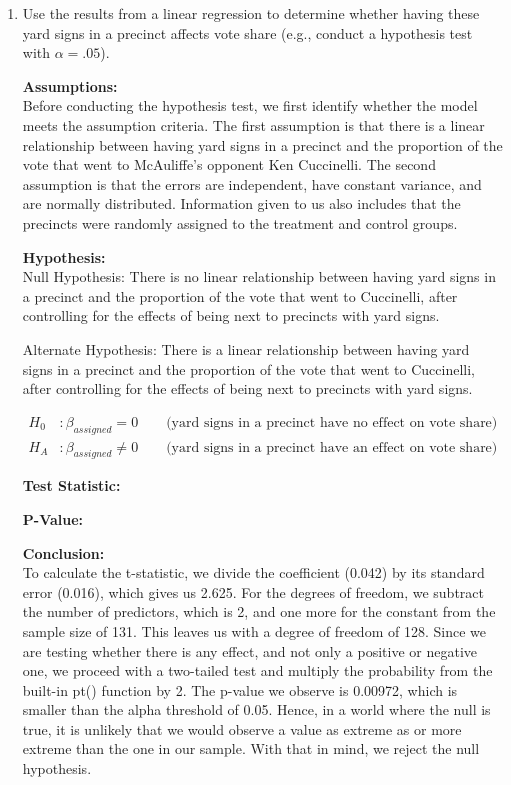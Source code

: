 \documentclass[12pt,letterpaper]{article}
\begin{document}
\vspace{.5cm}
\begin{enumerate}
	\item [(a)] Use the results from a linear regression to determine whether having these yard signs in a precinct affects vote share (e.g., conduct a hypothesis test with $\alpha = .05$).
	
	
		
	\textbf{Assumptions:}\\
	Before conducting the hypothesis test, we first identify whether the model meets the assumption criteria. The first assumption is that there is a linear relationship between having yard signs in a precinct and the proportion of the vote that went to McAuliffe's opponent Ken Cuccinelli. The second assumption is that the errors are independent, have constant variance, and are normally distributed. Information given to us also includes that the precincts were randomly assigned to the treatment and control groups. 
	
	\textbf{Hypothesis:}\\
	Null Hypothesis: There is no linear relationship between having yard signs in a precinct and the proportion of the vote that went to Cuccinelli, after controlling for the effects of being next to precincts with yard signs. 
	
	Alternate Hypothesis: There is a linear relationship between having yard signs in a precinct and the proportion of the vote that went to Cuccinelli, after controlling for the effects of being next to precincts with yard signs. 
	
	\begin{align*}
		H_0&: \beta_{assigned} = 0 \qquad \text{(yard signs in a precinct have no effect on vote share)}\\
		H_A&: \beta_{assigned} \neq 0 \qquad \text{(yard signs in a precinct have an effect on vote share)}
	\end{align*}
	
	\textbf{Test Statistic:}
	
	
	\textbf{P-Value:}
	
	
	\textbf{Conclusion:}\\
	To calculate the t-statistic, we divide the coefficient (0.042) by its standard error (0.016), which gives us 2.625. For the degrees of freedom, we subtract the number of predictors, which is 2, and one more for the constant from the sample size of 131. This leaves us with a degree of freedom of 128. Since we are testing whether there is any effect, and not only a positive or negative one, we proceed with a two-tailed test and multiply the probability from the built-in pt() function by 2. The p-value we observe is 0.00972, which is smaller than the alpha threshold of 0.05. Hence, in a world where the null is true, it is unlikely that we would observe a value as extreme as or more extreme than the one in our sample. With that in mind, we reject the null hypothesis.
	

\end{enumerate}
\end{document}
